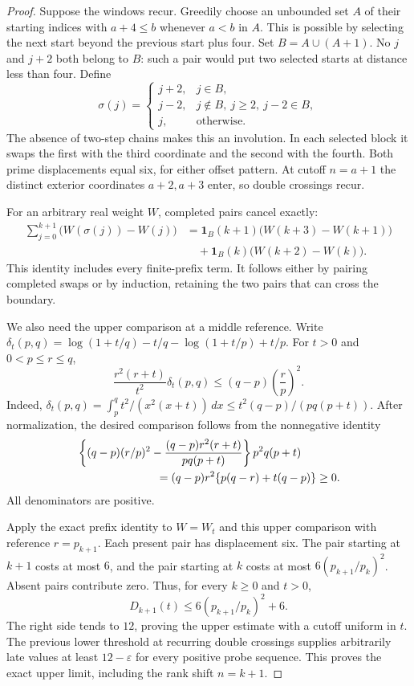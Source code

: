 \documentclass[11pt]{article}
\theoremstyle{definition}
\begin{document}
\begin{proof}
Suppose the windows recur. Greedily choose an unbounded set $A$ of
their starting indices with $a+4\le b$ whenever $a<b$ in $A$.
This is possible by selecting the next start beyond the previous start
plus four. Set $B=A\cup(A+1)$. No $j$ and $j+2$ both belong to $B$:
such a pair would put two selected starts at distance less than four.
Define
\[
 \sigma(j)=
 \begin{cases}
 j+2,&j\in B,\\
 j-2,&j\notin B,\ j\ge2,\ j-2\in B,\\
 j,&\text{otherwise}.
 \end{cases}
\]
The absence of two-step chains makes this an involution. In each
selected block it swaps the first with the third coordinate and the
second with the fourth. Both prime displacements equal six, for either
offset pattern. At cutoff $n=a+1$ the distinct exterior coordinates
$a+2,a+3$ enter, so double crossings recur.

For an arbitrary real weight $W$, completed pairs cancel exactly:
\begin{align*}
 \sum_{j=0}^{k+1}\bigl(W(\sigma(j))-W(j)\bigr)
 &=\mathbf1_B(k+1)\bigl(W(k+3)-W(k+1)\bigr)\\
 &\quad+\mathbf1_B(k)\bigl(W(k+2)-W(k)\bigr).
\end{align*}
This identity includes every finite-prefix term. It follows either
by pairing completed swaps or by induction, retaining the two pairs
that can cross the boundary.

We also need the upper comparison at a middle reference. Write
$\delta_t(p,q)=\log(1+t/q)-t/q-\log(1+t/p)+t/p$.
For $t>0$ and $0<p\le r\le q$,
\[
 \frac{r^2(r+t)}{t^2}\delta_t(p,q)
 \le(q-p)\left(\frac r p\right)^2.
\]
Indeed,
$\delta_t(p,q)=\int_p^q t^2/(x^2(x+t))\,dx
 \le t^2(q-p)/(pq(p+t))$.
After normalization, the desired comparison follows from the
nonnegative identity
\begin{align*}
 &\left\{(q-p)(r/p)^2-
   \frac{(q-p)r^2(r+t)}{pq(p+t)}\right\}p^2q(p+t)\\
 &\hspace{25mm}=(q-p)r^2\{p(q-r)+t(q-p)\}\ge0.
\end{align*}
All denominators are positive.

Apply the exact prefix identity to $W=W_t$ and this upper comparison
with reference $r=p_{k+1}$. Each present pair has displacement six.
The pair starting at $k+1$ costs at most $6$, and the pair starting
at $k$ costs at most $6(p_{k+1}/p_k)^2$. Absent pairs contribute zero.
Thus, for every $k\ge0$ and $t>0$,
\[
 D_{k+1}(t)\le6(p_{k+1}/p_k)^2+6.
\]
The right side tends to $12$, proving the upper estimate with a
cutoff uniform in $t$. The previous lower threshold at recurring
double crossings supplies arbitrarily late values at least
$12-\varepsilon$ for every positive probe sequence. This proves
the exact upper limit, including the rank shift $n=k+1$.


\end{proof}
\end{document}
